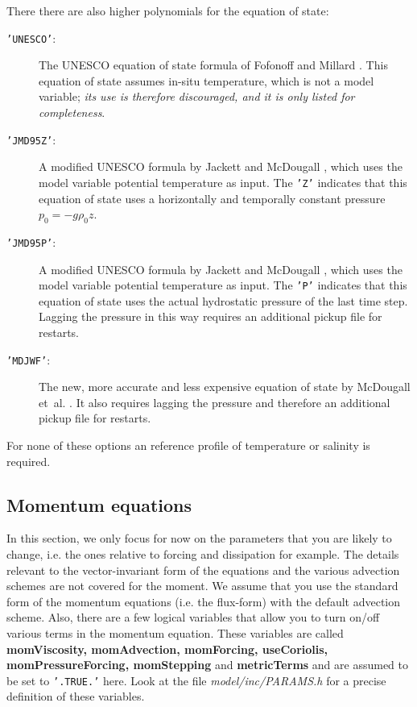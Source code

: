 There there are also higher polynomials for the equation of state:
\begin{description}
\item[\texttt{'UNESCO'}:] The UNESCO equation of state formula of
  Fofonoff and Millard \cite{fofonoff83}. This equation of state
  assumes in-situ temperature, which is not a model variable; {\em its
    use is therefore discouraged, and it is only listed for
    completeness}.
\item[\texttt{'JMD95Z'}:] A modified UNESCO formula by Jackett and
  McDougall \cite{jackett95}, which uses the model variable potential
  temperature as input. The \texttt{'Z'} indicates that this equation
  of state uses a horizontally and temporally constant pressure
  $p_{0}=-g\rho_{0}z$. 
\item[\texttt{'JMD95P'}:] A modified UNESCO formula by Jackett and
  McDougall \cite{jackett95}, which uses the model variable potential
  temperature as input. The \texttt{'P'} indicates that this equation
  of state uses the actual hydrostatic pressure of the last time
  step. Lagging the pressure in this way requires an additional pickup
  file for restarts.
\item[\texttt{'MDJWF'}:] The new, more accurate and less expensive
  equation of state by McDougall et~al. \cite{mcdougall03}. It also
  requires lagging the pressure and therefore an additional pickup
  file for restarts.
\end{description}
For none of these options an reference profile of temperature or
salinity is required.

\subsection{Momentum equations}

In this section, we only focus for now on the parameters that you are
likely to change, i.e. the ones relative to forcing and dissipation
for example.  The details relevant to the vector-invariant form of the
equations and the various advection schemes are not covered for the
moment. We assume that you use the standard form of the momentum
equations (i.e. the flux-form) with the default advection scheme.
Also, there are a few logical variables that allow you to turn on/off
various terms in the momentum equation. These variables are called
\textbf{momViscosity, momAdvection, momForcing, useCoriolis,
  momPressureForcing, momStepping} and \textbf{metricTerms }and are
assumed to be set to \texttt{'.TRUE.'} here.  Look at the file
\textit{model/inc/PARAMS.h }for a precise definition of these
variables.

